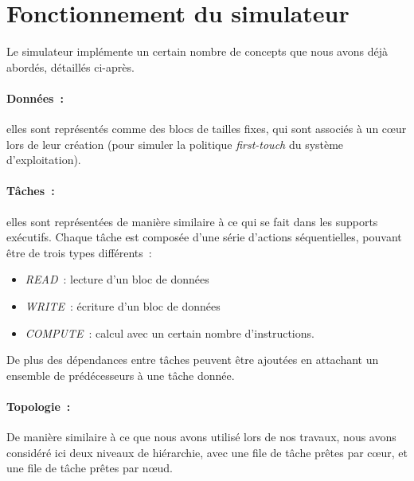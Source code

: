 \section{Fonctionnement du simulateur}\label{sec:simulation:archi}

Le simulateur implémente un certain nombre de concepts que nous avons déjà abordés, détaillés ci-après.


\paragraph{Données~:} elles sont représentés comme des blocs de tailles fixes, qui sont associés à un cœur lors de leur création (pour simuler la politique \emph{first-touch} du système d'exploitation).

\paragraph{Tâches~:} elles sont représentées de manière similaire à ce qui se fait dans les supports exécutifs.
Chaque tâche est composée d'une série d'actions séquentielles, pouvant être de trois types différents~:
\begin{itemize}
  \item \emph{READ}~: lecture d'un bloc de données
  \item \emph{WRITE}~: écriture d'un bloc de données
  \item \emph{COMPUTE}~: calcul avec un certain nombre d'instructions.
\end{itemize}

De plus des dépendances entre tâches peuvent être ajoutées en attachant un ensemble de prédécesseurs à une tâche donnée.

\paragraph{Topologie~:}
De manière similaire à ce que nous avons utilisé lors de nos travaux, nous avons considéré ici deux niveaux de hiérarchie, avec une file de tâche prêtes par cœur, et une file de tâche prêtes par nœud.

